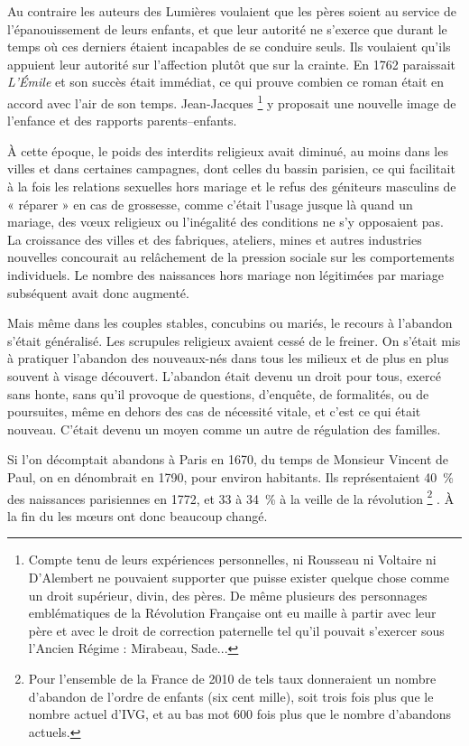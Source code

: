  Au contraire les auteurs des Lumières voulaient que les pères soient au service de l'épanouissement de leurs enfants, et que leur autorité ne s'exerce que durant le temps où ces derniers étaient incapables de se conduire seuls. Ils voulaient qu'ils appuient leur autorité sur l'affection plutôt que sur la crainte. En 1762 paraissait \emph{L'Émile} et son succès était immédiat, ce qui prouve combien ce roman était en accord avec l'air de son temps. Jean-Jacques %
\footnote{Compte tenu de leurs expériences personnelles, ni Rousseau ni Voltaire ni D'Alembert ne pouvaient supporter que puisse exister quelque chose comme un droit supérieur, divin, des pères. De même plusieurs des personnages emblématiques de la Révolution Française ont eu maille à partir avec leur père et avec le droit de correction paternelle tel qu'il pouvait s'exercer sous l'Ancien Régime : Mirabeau, Sade...} 
y proposait une nouvelle image de l'enfance et des rapports parents--enfants. 

 




 À cette époque, le poids des interdits religieux avait diminué, au moins dans les villes et dans certaines campagnes, dont celles du bassin parisien, ce qui facilitait à la fois les relations sexuelles hors mariage et le refus des géniteurs masculins de « réparer » en cas de grossesse, comme c'était l'usage jusque là quand un mariage, des vœux religieux ou l'inégalité des conditions ne s'y opposaient pas. La croissance des villes et des fabriques, ateliers, mines et autres industries nouvelles concourait au relâchement de la pression sociale sur les comportements individuels. Le nombre des naissances hors mariage non légitimées par mariage subséquent avait donc augmenté. 

 Mais même dans les couples stables, concubins ou mariés, le recours à l'abandon s'était généralisé. Les scrupules religieux avaient cessé de le freiner. On s'était mis à pratiquer l'abandon des nouveaux-nés dans tous les milieux et de plus en plus souvent à visage découvert. L'abandon était devenu un droit pour tous, exercé sans honte, sans qu'il provoque de questions, d'enquête, de formalités, ou de poursuites, même en dehors des cas de nécessité vitale, et c'est ce qui était nouveau. C'était devenu un moyen comme un autre de régulation des familles. 
 
  Si l'on décomptait  abandons à Paris en 1670, du temps de Monsieur Vincent de Paul, on en dénombrait  en 1790, pour environ  habitants. Ils représentaient 40~\% des naissances parisiennes en 1772, et 33 à 34~\% à la veille de la révolution%
\footnote{Pour l'ensemble de la France de 2010 de tels taux donneraient un nombre d'abandon de l'ordre de  enfants (six cent mille), soit trois fois plus que le nombre actuel d'IVG, et au bas mot 600 fois plus que le nombre d'abandons actuels.}%
. À la fin du  les mœurs ont donc beaucoup changé.

